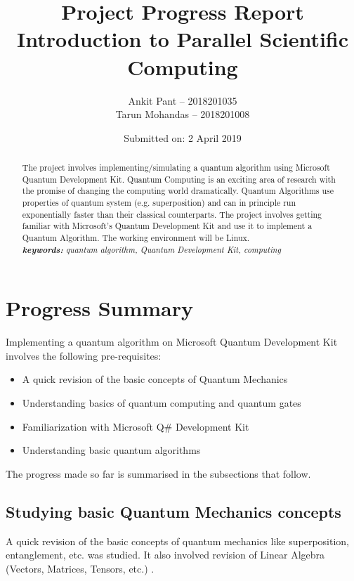 \documentclass[]{article}
\title{{\huge Project Progress Report} \newline \newline Introduction to Parallel Scientific Computing  \newline \newline {\large Implement/Simulate a Quantum Algorithm using \\Microsoft Quantum Development Kit}}
\author{ Ankit Pant -- 2018201035 \\ Tarun Mohandas -- 2018201008}
\date{Submitted on: 2 April 2019}
\begin{document}
	\maketitle
	\newpage
	
	\begin{abstract}
		The project involves implementing/simulating a quantum algorithm using Microsoft Quantum Development Kit. Quantum Computing is an exciting area of research with the promise of changing the computing world dramatically. Quantum Algorithms use properties of quantum system (e.g. superposition) and can in principle run exponentially faster than their classical counterparts.
		\newline
		The project involves getting familiar with Microsoft's Quantum Development Kit and use it to implement a Quantum Algorithm. The working environment will be Linux.
		\\
		\textit{\textbf{keywords:} quantum algorithm, Quantum Development Kit, computing}
	\end{abstract}
	
	\newpage
	\tableofcontents
	\newpage
	
	\section{Progress Summary}
		Implementing a quantum algorithm on Microsoft Quantum Development Kit involves the following pre-requisites:
		\begin{itemize}
			\item A quick revision of the basic concepts of Quantum Mechanics
			\item Understanding basics  of quantum computing and quantum gates
			\item Familiarization with Microsoft Q\# Development Kit
			\item Understanding basic quantum algorithms \\
		\end{itemize}
		
		The progress made so far is summarised in the subsections that follow.
		
		\subsection{Studying basic Quantum Mechanics concepts }
			A quick revision of the basic concepts of quantum mechanics like superposition, entanglement, etc. was studied. It also involved revision of Linear Algebra (Vectors, Matrices, Tensors, etc.) \cite{1}.
			
\end{document}
